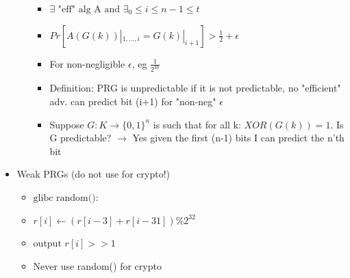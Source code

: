 \documentclass[]{article}
\begin{document}
\begin{itemize}
\begin{itemize}
\begin{itemize}
			\item $\exists \text{ "eff" alg A and } \exists_{0} \leq i \leq n-1 \leq t$
			\item $Pr[A(G(k)) |_{1,...,i} = G(k) |_{i+1}] > \frac{1}{2} + \epsilon$
			\item For non-negligible $\epsilon$, eg $\frac{1}{2^{30}}$
			\item Definition: PRG is unpredictable if it is not predictable, no "efficient" adv. can predict bit (i+1) for "non-neg" $\epsilon$
			\item Suppose $G:K \rightarrow \{0,1\}^{n}$ is such that for all k: $XOR(G(k)) = 1$. Is G predictable? $\rightarrow$ Yes given the first (n-1) bits I can predict the n'th bit
		\end{itemize}
	\end{itemize}
	\item Weak PRGs (do not use for crypto!)
	\begin{itemize}
		\item $\text{glibc random():}$
		\item $		r[i] \leftarrow (r[i-3] + r[i-31]) \% 2^{32}$
		\item $		\text{output } r[i] >> 1$
		\item Never use random() for crypto
	\end{itemize}
\end{itemize}
\end{document}
